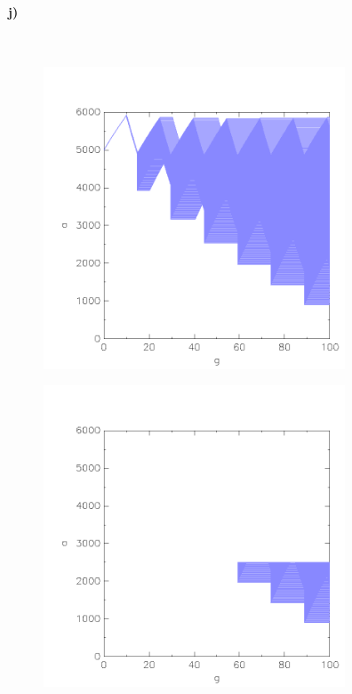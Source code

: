 \paragraph{j)}\mbox{} \\
\begin{minipage}[t]{0.5\textwidth} 
	\begin{figure}[H]
		\centering
		\includegraphics[width=0.8\textwidth]{Aufgabe_j1).png}
	\end{figure}
\end{minipage}
\hfill
\begin{minipage}[t]{0.5\textwidth} 
	\begin{figure}[H]
		\centering
		\includegraphics[width=0.8\textwidth]{Aufgabe_j2).png}
	\end{figure}
\end{minipage}

